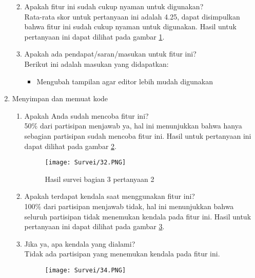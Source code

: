 \begin{enumerate}
\begin{enumerate}
\begin{figure}[H]
        	\label{fig:5:survei24} 
        \end{figure}
        \item Apakah fitur ini sudah cukup nyaman untuk digunakan? \\ Rata-rata skor untuk pertanyaan ini adalah 4.25, dapat disimpulkan bahwa fitur ini sudah cukup nyaman untuk digunakan. Hasil untuk pertanyaan ini dapat dilihat pada gambar \ref{fig:5:survei24}.
        \item Apakah ada pendapat/saran/masukan untuk fitur ini? \\ Berikut ini adalah masukan yang didapatkan:
        \begin{itemize}
            \item Mengubah tampilan agar editor lebih mudah digunakan
        \end{itemize}
    \end{enumerate}
    \item Menyimpan dan memuat kode
    \begin{enumerate}
        \begin{figure}[H]
        	\centering  
        	\texttt{[image: Survei/31.PNG]}  
        	\caption{Hasil survei bagian 3 pertanyaan 1}
        	\label{fig:5:survei31} 
        \end{figure}
        \item Apakah Anda sudah mencoba fitur ini? \\ 50\% dari partisipan menjawab ya, hal ini menunjukkan bahwa hanya sebagian partisipan sudah mencoba fitur ini. Hasil untuk pertanyaan ini dapat dilihat pada gambar \ref{fig:5:survei31}.
        \begin{figure}[H]
        	\centering  
        	\texttt{[image: Survei/32.PNG]}  
        	\caption{Hasil survei bagian 3 pertanyaan 2}
        	\label{fig:5:survei32} 
        \end{figure}
        \item Apakah terdapat kendala saat menggunakan fitur ini? \\ 100\% dari partisipan menjawab tidak, hal ini menunjukkan bahwa seluruh partisipan tidak menemukan kendala pada fitur ini. Hasil untuk pertanyaan ini dapat dilihat pada gambar \ref{fig:5:survei32}.
        \item Jika ya, apa kendala yang dialami? \\ Tidak ada partisipan yang menemukan kendala pada fitur ini.
        \begin{figure}[H]
        	\centering  
        	\texttt{[image: Survei/34.PNG]}  

\end{figure}
\end{enumerate}
\end{enumerate}
